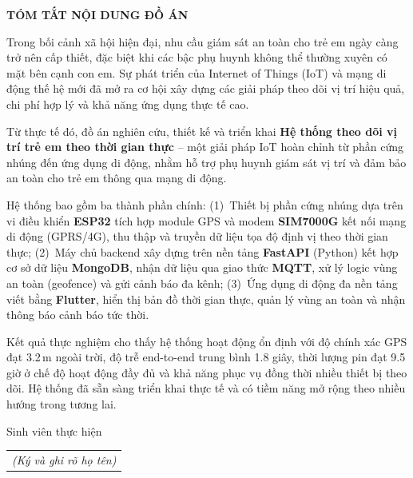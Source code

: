 \documentclass[../DoAn.tex]{subfiles}
\begin{document}
\begin{center}
    \Large{\textbf{TÓM TẮT NỘI DUNG ĐỒ ÁN}}\\
\end{center}
\vspace{1cm}
Trong bối cảnh xã hội hiện đại, nhu cầu giám sát an toàn cho trẻ em ngày càng trở nên cấp thiết, đặc biệt khi các bậc phụ huynh không thể thường xuyên có mặt bên cạnh con em. Sự phát triển của Internet of Things (IoT) và mạng di động thế hệ mới đã mở ra cơ hội xây dựng các giải pháp theo dõi vị trí hiệu quả, chi phí hợp lý và khả năng ứng dụng thực tế cao.

Từ thực tế đó, đồ án nghiên cứu, thiết kế và triển khai \textbf{Hệ thống theo dõi vị trí trẻ em theo thời gian thực} -- một giải pháp IoT hoàn chỉnh từ phần cứng nhúng đến ứng dụng di động, nhằm hỗ trợ phụ huynh giám sát vị trí và đảm bảo an toàn cho trẻ em thông qua mạng di động.

Hệ thống bao gồm ba thành phần chính: (1)~Thiết bị phần cứng nhúng dựa trên vi điều khiển \textbf{ESP32} tích hợp module GPS và modem \textbf{SIM7000G} kết nối mạng di động (GPRS/4G), thu thập và truyền dữ liệu tọa độ định vị theo thời gian thực; (2)~Máy chủ backend xây dựng trên nền tảng \textbf{FastAPI} (Python) kết hợp cơ sở dữ liệu \textbf{MongoDB}, nhận dữ liệu qua giao thức \textbf{MQTT}, xử lý logic vùng an toàn (geofence) và gửi cảnh báo đa kênh; (3)~Ứng dụng di động đa nền tảng viết bằng \textbf{Flutter}, hiển thị bản đồ thời gian thực, quản lý vùng an toàn và nhận thông báo cảnh báo tức thời.

Kết quả thực nghiệm cho thấy hệ thống hoạt động ổn định với độ chính xác GPS đạt 3.2\,m ngoài trời, độ trễ end-to-end trung bình 1.8 giây, thời lượng pin đạt 9.5 giờ ở chế độ hoạt động đầy đủ và khả năng phục vụ đồng thời nhiều thiết bị theo dõi. Hệ thống đã sẵn sàng triển khai thực tế và có tiềm năng mở rộng theo nhiều hướng trong tương lai.

\begin{flushright}
Sinh viên thực hiện\\
\begin{tabular}{@{}c@{}}
\textit{(Ký và ghi rõ họ tên)}
\end{tabular}
\end{flushright}
\end{document}
